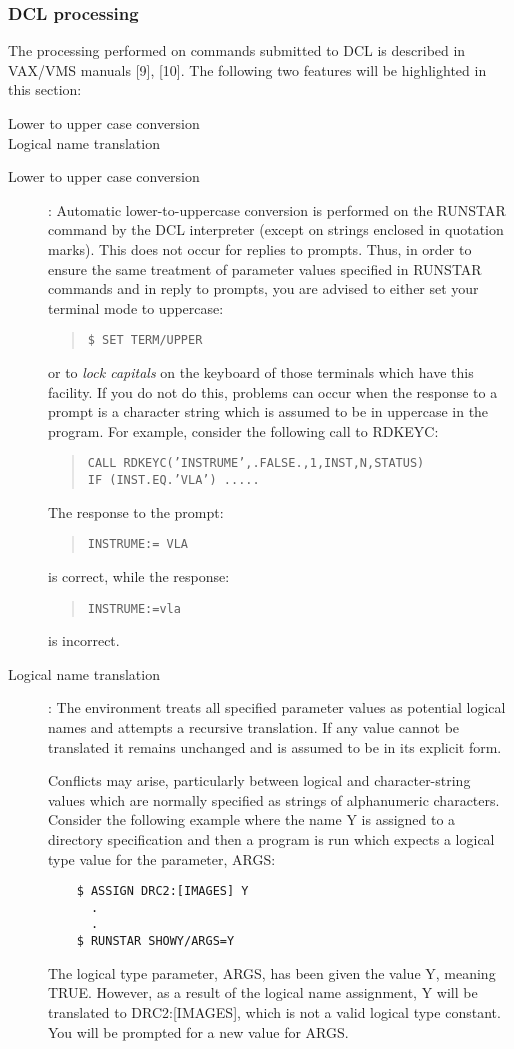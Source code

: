 \subsubsection {DCL processing}
The processing performed on commands submitted to DCL is described in VAX/VMS
manuals [9], [10].
The following two features will be highlighted in this section:
\begin{description}
\begin{description}
\item [Lower to upper case conversion]
\item [Logical name translation]
\end{description}
\end{description}
\begin{description}
\item [Lower to upper case conversion]:
Automatic lower-to-uppercase conversion is performed on the RUNSTAR command by
the DCL interpreter (except on strings enclosed in quotation marks).
This does not occur for replies to prompts.
Thus, in order to ensure the same treatment of parameter values specified in
RUNSTAR commands and in reply to prompts, you are advised to either set your
terminal mode to uppercase:
\begin{quote}
{\tt \$ SET TERM/UPPER}
\end{quote}
or to {\em lock capitals} on the keyboard of those terminals which have this
facility.
If you do not do this, problems can occur when the response to a prompt is a
character string which is assumed to be in uppercase in the program.
For example, consider the following call to RDKEYC:
\begin{quote}
{\tt CALL RDKEYC('INSTRUME',.FALSE.,1,INST,N,STATUS)\\
IF (INST.EQ.'VLA') .....}
\end{quote}
The response to the prompt:
\begin{quote}
{\tt INSTRUME:= VLA}
\end{quote}
is correct, while the response:
\begin{quote}
{\tt INSTRUME:=vla}
\end{quote}
is incorrect.
\item [Logical name translation]:
The environment treats all specified parameter values as potential logical
names and attempts a recursive translation.
If any value cannot be translated it remains unchanged and is assumed to be in
its explicit form.

Conflicts may arise, particularly between logical and character-string
values which are normally specified as strings of alphanumeric characters.
Consider the following example where the name Y is assigned to a directory
specification and then a program is run which expects a logical type value for
the parameter, ARGS:
\begin{verbatim}
    $ ASSIGN DRC2:[IMAGES] Y
      .
      .
    $ RUNSTAR SHOWY/ARGS=Y
\end{verbatim}
The logical type parameter, ARGS, has been given the value Y, meaning TRUE.
However, as a result of the logical name assignment, Y will be translated to
DRC2:[IMAGES], which is not a valid logical type constant.
You will be prompted for a new value for ARGS.


\end{description}
